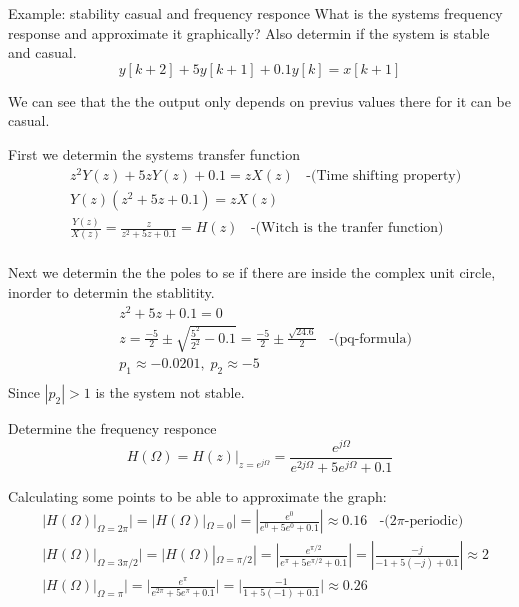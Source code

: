 \documentclass{article}
\begin{document}
\begin{exampleblock}{Example: stability casual and frequency responce} %
    What is the systems frequency response and approximate it graphically? Also determin if the system is 
    stable and casual. 
    \begin{equation*}
        y[k+2]+5y[k+1]+0.1y[k] = x[k+1]
    \end{equation*}

    We can see that the the output only depends on previus values there for 
    it can be casual.

    First we determin the systems transfer function
    \begin{align*}
        &z^2Y(z)+5zY(z)+0.1 = zX(z) \;\; \text{ -(Time shifting property)} \\
        &Y(z)(z^2+5z+0.1) = zX(z) \\
        &\frac{Y(z)}{X(z)} = \frac{z}{z^2+5z+0.1} = H(z) \;\; \text{ -(Witch is the tranfer function)} \\
    \end{align*}

    Next we determin the the poles to se if there are inside the complex unit circle, 
    inorder to determin the stablitity.
    \begin{align*}
        &z^2+5z+0.1 = 0 \\
        &z=\frac{-5}{2}\pm\sqrt{\frac{5^2}{2^2}-0.1}=\frac{-5}{2}\pm\frac{\sqrt{24.6}}{2} \;\; \text{ -(pq-formula)}\\
        &p_1\approx-0.0201, \; p_2\approx-5 \\ 
    \end{align*}
    Since $|p_2|>1$ is the system not stable.

    Determine the frequency responce
    \begin{equation*}
        H(\Omega) = H(z)|_{z=e^{j\Omega}} = \frac{e^{j\Omega}}{e^{2j\Omega} + 5e^{j\Omega} + 0.1}
    \end{equation*}

    Calculating some points to be able to approximate the graph:
    \begin{align*}
        &|H(\Omega)|_{\Omega=2\pi}| = |H(\Omega)|_{\Omega=0}| = |\frac{e^0}{e^0+5e^0+0.1}| \approx 0.16 \;\; \text{ -($2\pi$-periodic)}\\
        &|H(\Omega)|_{\Omega=3\pi/2}| = |H(\Omega)|_{\Omega=\pi/2}| = |\frac{e^{\pi/2}}{e^{\pi}+5e^{\pi/2}+0.1}| = |\frac{-j}{-1+5(-j)+0.1}| \approx 2 \\
        &|H(\Omega)|_{\Omega=\pi}| = |\frac{e^{\pi}}{e^{2\pi}+5e^{\pi}+0.1}| = |\frac{-1}{1+5(-1)+0.1}| \approx 0.26 \\
    \end{align*}

\end{exampleblock}
\end{document}
